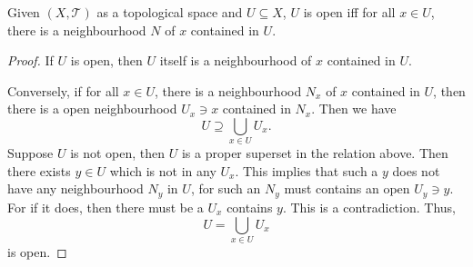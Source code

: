 \begin{proposition}
	\label{prop: alt-def of open sets by neighbourhoods}
	Given $(X, \mathcal T)$ as a topological space and $U \subseteq X$, $U$ is open iff for all $x \in U$, there is a neighbourhood $N$ of $x$ contained in $U$.
	
	\begin{proof}
		If $U$ is open, then $U$ itself is a neighbourhood of $x$ contained in $U$.
		
		Conversely, if for all $x \in U$, there is a neighbourhood $N_x$ of $x$ contained in $U$, then there is a open neighbourhood $U_x \ni x$ contained in $N_x$. Then we have
		$$
		U \supseteq \bigcup_{x \in U} U_x.
		$$
		Suppose $U$ is not open, then $U$ is a proper superset in the relation above. Then there exists $y \in U$ which is not in any $U_x$. This implies that such a $y$ does not have any neighbourhood $N_y$ in $U$, for such an $N_y$ must contains an open $U_y \ni y$. For if it does, then there must be a $U_x$ contains $y$. This is a contradiction. Thus,
		$$
		U = \bigcup_{x \in U} U_x
		$$
		is open.
	\end{proof}
\end{proposition}
